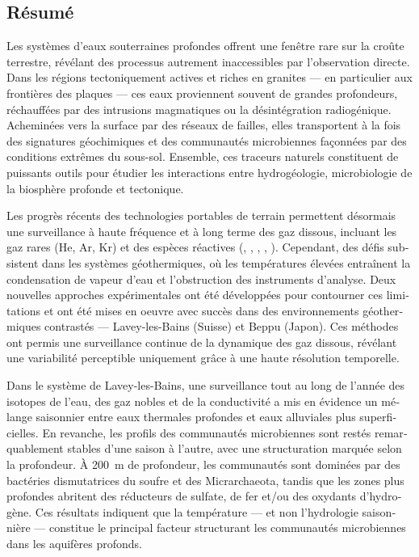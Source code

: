 \begin{otherlanguage}{french}
\chapter*{Résumé}

Les systèmes d’eaux souterraines profondes offrent une fenêtre rare sur la croûte terrestre, révélant des processus autrement inaccessibles par l’observation directe.
Dans les régions tectoniquement actives et riches en granites --- en particulier aux frontières des plaques --- ces eaux proviennent souvent de grandes profondeurs, réchauffées par des intrusions magmatiques ou la désintégration radiogénique.
Acheminées vers la surface par des réseaux de failles, elles transportent à la fois des signatures géochimiques et des communautés microbiennes façonnées par des conditions extrêmes du sous-sol.
Ensemble, ces traceurs naturels constituent de puissants outils pour étudier les interactions entre hydrogéologie, microbiologie de la biosphère profonde et tectonique.

Les progrès récents des technologies portables de terrain permettent désormais une surveillance à haute fréquence et à long terme des gaz dissous, incluant les gaz rares (He, Ar, Kr) et des espèces réactives (, , , , ).
Cependant, des défis subsistent dans les systèmes géothermiques, où les températures élevées entraînent la condensation de vapeur d’eau et l’obstruction des instruments d’analyse.
Deux nouvelles approches expérimentales ont été développées pour contourner ces limitations et ont été mises en oeuvre avec succès dans des environnements géothermiques contrastés --- Lavey-les-Bains (Suisse) et Beppu (Japon).
Ces méthodes ont permis une surveillance continue de la dynamique des gaz dissous, révélant une variabilité perceptible uniquement grâce à une haute résolution temporelle.

Dans le système de Lavey-les-Bains, une surveillance tout au long de l'année des isotopes de l’eau, des gaz nobles et de la conductivité a mis en évidence un mélange saisonnier entre eaux thermales profondes et eaux alluviales plus superficielles.
En revanche, les profils des communautés microbiennes sont restés remarquablement stables d’une saison à l’autre, avec une structuration marquée selon la profondeur.
À \SI{200}{\metre} de profondeur, les communautés sont dominées par des bactéries dismutatrices du soufre et des Micrarchaeota, tandis que les zones plus profondes abritent des réducteurs de sulfate, de fer et/ou des oxydants d’hydrogène.
Ces résultats indiquent que la température --- et non l’hydrologie saisonnière --- constitue le principal facteur structurant les communautés microbiennes dans les aquifères profonds.


\end{otherlanguage}
